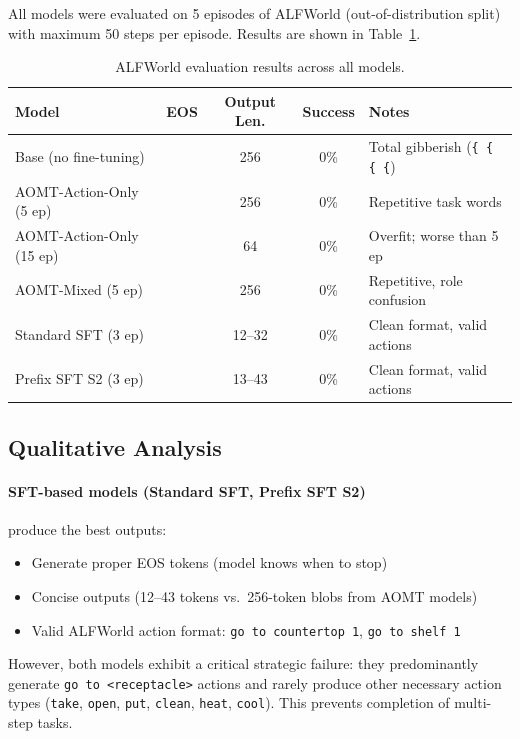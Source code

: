 \documentclass[11pt,a4paper]{article}
\newcommand{\cmark}{\ding{51}}
\newcommand{\xmark}{\ding{55}}
\begin{document}
All models were evaluated on 5 episodes of ALFWorld (out-of-distribution split) with maximum 50 steps per episode. Results are shown in Table~\ref{tab:results}.

\begin{table}[h]
\centering
\caption{ALFWorld evaluation results across all models.}
\label{tab:results}
\begin{tabular}{lcccl}
\toprule
\textbf{Model} & \textbf{EOS} & \textbf{Output Len.} & \textbf{Success} & \textbf{Notes} \\
\midrule
Base (no fine-tuning) & \xmark & 256 & 0\% & Total gibberish (\texttt{\{ \{ \{ \{}) \\
AOMT-Action-Only (5 ep) & \xmark & 256 & 0\% & Repetitive task words \\
AOMT-Action-Only (15 ep) & \xmark & 64 & 0\% & Overfit; worse than 5 ep \\
AOMT-Mixed (5 ep) & \xmark & 256 & 0\% & Repetitive, role confusion \\
Standard SFT (3 ep) & \cmark & 12--32 & 0\% & Clean format, valid actions \\
Prefix SFT S2 (3 ep) & \cmark & 13--43 & 0\% & Clean format, valid actions \\
\bottomrule
\end{tabular}
\end{table}

\subsection{Qualitative Analysis}

\paragraph{SFT-based models (Standard SFT, Prefix SFT S2)} produce the best outputs:
\begin{itemize}[nosep]
  \item Generate proper EOS tokens (model knows when to stop)
  \item Concise outputs (12--43 tokens vs.\ 256-token blobs from AOMT models)
  \item Valid ALFWorld action format: \texttt{go to countertop 1}, \texttt{go to shelf 1}
\end{itemize}

However, both models exhibit a critical strategic failure: they predominantly generate \texttt{go to <receptacle>} actions and rarely produce other necessary action types (\texttt{take}, \texttt{open}, \texttt{put}, \texttt{clean}, \texttt{heat}, \texttt{cool}). This prevents completion of multi-step tasks.
\end{document}
